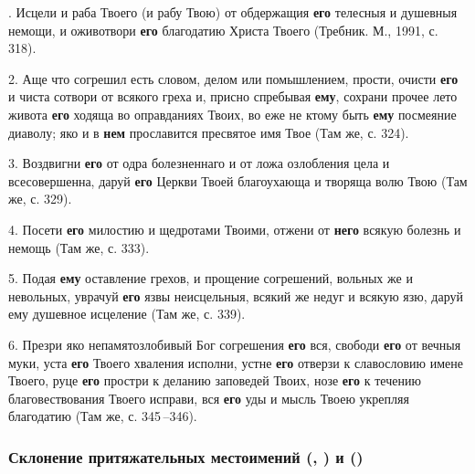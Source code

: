 \documentclass[11pt,a4paper,oneside]{memoir}
\begin{document}
. Исцели и раба Твоего (и рабу Твою) от обдержащия \textbf{его}
телесныя и душевныя немощи, и оживотвори \textbf{его} благодатию
Христа Твоего (Требник. М., 1991, с. 318).

2. Аще что согрешил есть словом, делом или помышлением, прости,
очисти \textbf{его} и чиста сотвори от всякого греха и, присно
спребывая \textbf{ему}, сохрани прочее лето живота \textbf{его}
ходяща во оправданиях Твоих, во еже не ктому быть \textbf{ему}
посмеяние диаволу; яко и в \textbf{нем} прославится пресвятое имя
Твое (Там же, с. 324).

3. Воздвигни \textbf{его} от одра болезненнаго и от ложа озлобления
цела и всесовершенна, даруй \textbf{его} Церкви Твоей благоухающа и
творяща волю Твою (Там же, с. 329).

4. Посети \textbf{его} милостию и щедротами Твоими, отжени от
\textbf{него} всякую болезнь и немощь (Там же, с. 333).

5. Подая \textbf{ему} оставление грехов, и прощение согрешений,
вольных же и невольных, уврачуй \textbf{его} язвы неисцельныя, всякий
же недуг и всякую язю, даруй ему душевное исцеление (Там же, с. 339).

6. Презри яко непамятозлобивый Бог согрешения \textbf{его} вся,
свободи \textbf{его} от вечныя муки, уста \textbf{его} Твоего
хваления исполни, устне \textbf{его} отверзи к славословию имене
Твоего, руце \textbf{его} простри к деланию заповедей Твоих, нозе
\textbf{его} к течению благовествования Твоего исправи, вся
\textbf{его} уды и мысль Твоею укрепляя благодатию (Там же, с. 345\,--346).

\subsubsection[Склонение притяжательных местоимений]{Склонение
притяжательных местоимений {} ({},
{}) и {} ({})}
\end{document}
